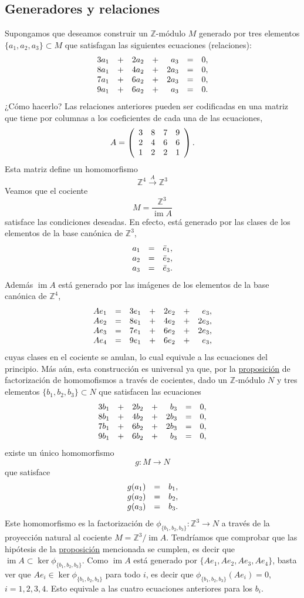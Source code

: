 \hypertarget{generadores-y-relaciones}{%
\subsection{Generadores y relaciones}\label{generadores-y-relaciones}}

Supongamos que deseamos construir un \(\mathbb Z\)-módulo \(M\) generado
por tres elementos \(\{a_1,a_2,a_3\}\subset M\) que satisfagan las
siguientes ecuaciones (relaciones): \[\begin{array}{rcrcrcl}
3a_1&+&2a_2&+&a_3&=&0,\cr
8a_1&+&4a_2&+&2a_3&=&0,\cr
7a_1&+&6a_2&+&2a_3&=&0,\cr
9a_1&+&6a_2&+&a_3&=&0.
\end{array}\] ¿Cómo hacerlo? Las relaciones anteriores pueden ser
codificadas en una matriz que tiene por columnas a los coeficientes de
cada una de las ecuaciones, \[A=\left(\begin{array}{cccc}
3&8&7&9\cr
2&4&6&6\cr
1&2&2&1
\end{array}\right).\] Esta matriz define un homomorfismo
\[\mathbb{Z}^4\stackrel{A}\longrightarrow \mathbb{Z}^3\] Veamos que el
cociente \[M=\frac{\mathbb{Z}^3}{\operatorname{im}A}\] satisface las
condiciones deseadas. En efecto, está generado por las clases de los
elementos de la base canónica de \(\mathbb{Z}^3\), \[\begin{array}{rcl}
a_1&=&\bar{e}_1,\cr
a_2&=&\bar{e}_2,\cr
a_3&=&\bar{e}_3.
\end{array}\] Además \(\operatorname{im}A\) está generado por las
imágenes de los elementos de la base canónica de \(\mathbb{Z}^4\),
\[\begin{array}{rcrcrcr}
Ae_1&=&3e_1&+&2e_2&+&e_3,\cr
Ae_2&=&8e_1&+&4e_2&+&2e_3,\cr
Ae_3&=&7e_1&+&6e_2&+&2e_3,\cr
Ae_4&=&9e_1&+&6e_2&+&e_3,
\end{array}\] cuyas clases en el cociente se anulan, lo cual equivale a
las ecuaciones del principio. Más aún, esta construcción es universal ya
que, por la \protect\hyperlink{factorquotientmodules}{proposición} de
factorización de homomofismos a través de cocientes, dado un
\(\mathbb Z\)-módulo \(N\) y tres elementos
\(\{b_1,b_2,b_3\}\subset N\) que satisfacen las ecuaciones
\[\begin{array}{rcrcrcl}
3b_1&+&2b_2&+&b_3&=&0,\cr
8b_1&+&4b_2&+&2b_3&=&0,\cr
7b_1&+&6b_2&+&2b_3&=&0,\cr
9b_1&+&6b_2&+&b_3&=&0,
\end{array}\] existe un único homomorfismo
\[g\colon M\longrightarrow N\] que satisface \[\begin{array}{rcl}
g(a_1)&=&b_1,\cr
g(a_2)&=&b_2,\cr
g(a_3)&=&b_3.
\end{array}\] Este homomorfismo es la factorización de
\(\phi_{\{b_1,b_2,b_3\}}\colon\mathbb{Z}^3\rightarrow N\) a través
de la proyección natural al cociente
\(M=\mathbb{Z}^3/\operatorname{im}A\). Tendríamos que comprobar que las
hipótesis de la \protect\hyperlink{factorquotientmodules}{proposición}
mencionada se cumplen, es decir que
\(\operatorname{im} A\subset \ker \phi_{\{b_1,b_2,b_3\}}\). Como
\(\operatorname{im} A\) está generado por
\(\{Ae_1,Ae_2,Ae_3,Ae_4\}\), basta ver que
\(Ae_i\in \ker \phi_{\{b_1,b_2,b_3\}}\) para todo \(i\), es decir
que \(\phi_{\{b_1,b_2,b_3\}}(Ae_i)=0\), \(i=1,2,3,4\). Esto
equivale a las cuatro ecuaciones anteriores para los \(b_i\).


